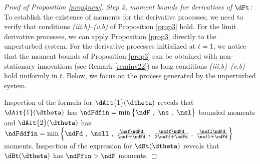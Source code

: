 \begin{proof}[Proof of Proposition \ref{prop4new}]
\smallskip
\textit{Step 2, moment bounds for derivatives of $\dFt$:}
To establish the existence of moments for the derivative processes,
we need to verify that conditions \textit{(iii.b)}--\textit{(v.b)} of Proposition \ref{prop3} hold. For the limit derivative processes, we can apply Proposition \ref{prop3} directly to the unperturbed system. For the derivative processes initialized at $t=1$, we notice that the moment bounds of Proposition \ref{prop3} can be obtained with non-stationary innovations (see Remark \ref{reminv22}) as long conditions \textit{(iii.b)}--\textit{(v.b)} hold uniformly in $t$. Below, we focus on the process generated by the unperturbed system.


Inspection of the formula for  $\dAit{1}(\dtheta)$ reveals that $\dAit{1}(\dtheta)$  has  $\ndFdfin = \min \big\{\ndF\ ,\  \ns \ , \  \nsl \big\}$ bounded moments and $\dAit{2}(\dtheta)$ has  $\ndFddfin = \min \Big\{\ndFd\ ,\  \nsll \ , \ \frac{\nsf \ndFd }{\nsf + \ndFd} \ , 
   \ \frac{\nsff \ndFd }{2 \nsff + \ndFd} \ , \ \frac{ \nsfl \ndFd }{ \nsfl + \ndFd} \Big\}$ moments. Inspection of the expression for $\dBt(\dtheta)$ reveals that $\dBt(\dtheta)$ has $\ndFfin>\ndF$ moments. 


\end{proof}
